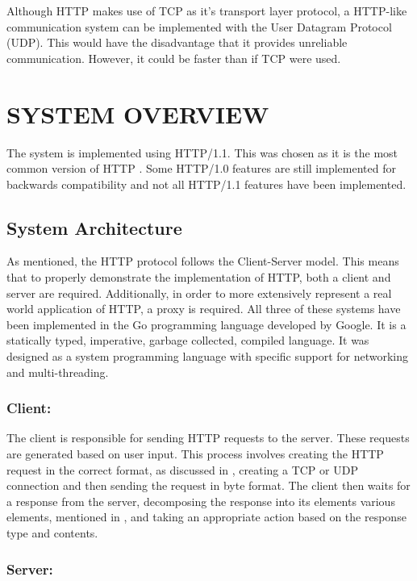 \documentclass[10pt,twocolumn]{witseiepaper}
\begin{document}
	Although HTTP makes use of TCP as it's transport layer protocol, a HTTP-like communication system can be implemented with the User Datagram Protocol (UDP). This would have the disadvantage that it provides unreliable communication. However, it could be faster than if TCP were used.

\section{SYSTEM OVERVIEW} \label{sysover}

The system is implemented using HTTP/1.1. This was chosen as it is the most common version of HTTP \cite{}. Some HTTP/1.0 features are still implemented for backwards compatibility and not all HTTP/1.1 features have been implemented.

	\subsection{System Architecture}

	As mentioned, the HTTP protocol follows the Client-Server model. This means that to properly demonstrate the implementation of HTTP, both a client and server are required. Additionally, in order to more extensively represent a real world application of HTTP, a proxy is required. All three of these systems have been implemented in the Go programming language developed by Google. It is a statically typed, imperative, garbage collected, compiled language. It was designed as a system programming language with specific support for networking and multi-threading.

	\subsubsection{Client:}

	The client is responsible for sending HTTP requests to the server. These requests are generated based on user input. This process involves creating the HTTP request in the correct format, as discussed in , creating a TCP or UDP connection and then sending the request in byte format. The client then waits for a response from the server, decomposing the response into its elements various elements, mentioned in , and taking an appropriate action based on the response type and contents.

	\subsubsection{Server:}
\end{document}
